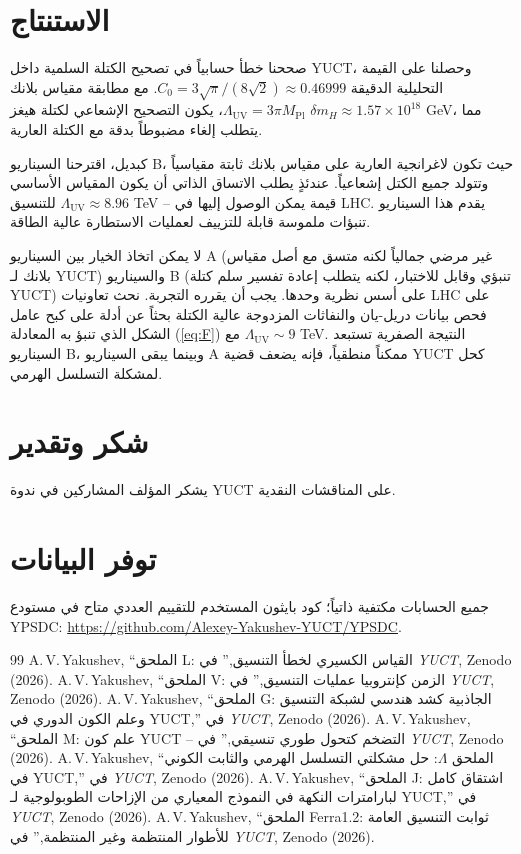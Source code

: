 \documentclass[11pt,a4paper]{article}
\newcommand{\Mpl}{M_{\mathrm{Pl}}}
\newcommand{\LUV}{\Lambda_{\mathrm{UV}}}
\theoremstyle{remark}
\begin{document}
\begin{otherlanguage}{arabic}
		\section{الاستنتاج}
		\label{sec:conclusion}
		
		صححنا خطأ حسابياً في تصحيح الكتلة السلمية داخل YUCT، وحصلنا على القيمة التحليلية الدقيقة \(C_0 = 3\sqrt{\pi}/(8\sqrt{2}) \approx 0.46999\). مع مطابقة مقياس بلانك \(\LUV = 3\pi\Mpl\)، يكون التصحيح الإشعاعي لكتلة هيغز \(\delta m_H \approx 1.57\times 10^{18}\) GeV، مما يتطلب إلغاء مضبوطاً بدقة مع الكتلة العارية.
		
		كبديل، اقترحنا السيناريو B، حيث تكون لاغرانجية العارية على مقياس بلانك ثابتة مقياسياً وتتولد جميع الكتل إشعاعياً. عندئذٍ يطلب الاتساق الذاتي أن يكون المقياس الأساسي للتنسيق \(\LUV \approx 8.96\) TeV – قيمة يمكن الوصول إليها في LHC. يقدم هذا السيناريو تنبؤات ملموسة قابلة للتزييف لعمليات الاستطارة عالية الطاقة.
		
		لا يمكن اتخاذ الخيار بين السيناريو A (غير مرضي جمالياً لكنه متسق مع أصل مقياس بلانك لـ YUCT) والسيناريو B (تنبؤي وقابل للاختبار، لكنه يتطلب إعادة تفسير سلم كتلة YUCT) على أسس نظرية وحدها. يجب أن يقرره التجربة. نحث تعاونيات LHC على فحص بيانات دريل-يان والنفاثات المزدوجة عالية الكتلة بحثاً عن أدلة على كبح عامل الشكل الذي تنبؤ به المعادلة (\ref{eq:F}) مع \(\LUV \sim 9\) TeV. النتيجة الصفرية تستبعد السيناريو B، وبينما يبقى السيناريو A ممكناً منطقياً، فإنه يضعف قضية YUCT كحل لمشكلة التسلسل الهرمي.
		
		\section*{شكر وتقدير}
		يشكر المؤلف المشاركين في ندوة YUCT على المناقشات النقدية.
		
		\section*{توفر البيانات}
		جميع الحسابات مكتفية ذاتياً؛ كود بايثون المستخدم للتقييم العددي متاح في مستودع YPSDC: \url{https://github.com/Alexey-Yakushev-YUCT/YPSDC}.
		
		\begin{thebibliography}{99}
			 A.\,V.\,Yakushev, “الملحق L: القياس الكسيري لخطأ التنسيق,” في \emph{YUCT}, Zenodo (2026).
			 A.\,V.\,Yakushev, “الملحق V: الزمن كإنتروبيا عمليات التنسيق,” في \emph{YUCT}, Zenodo (2026).
			 A.\,V.\,Yakushev, “الملحق G: الجاذبية كشد هندسي لشبكة التنسيق وعلم الكون الدوري في YUCT,” في \emph{YUCT}, Zenodo (2026).
			 A.\,V.\,Yakushev, “الملحق M: علم كون YUCT – التضخم كتحول طوري تنسيقي,” في \emph{YUCT}, Zenodo (2026).
			 A.\,V.\,Yakushev, “الملحق \(\Lambda\): حل مشكلتي التسلسل الهرمي والثابت الكوني في YUCT,” في \emph{YUCT}, Zenodo (2026).
			 A.\,V.\,Yakushev, “الملحق J: اشتقاق كامل لبارامترات النكهة في النموذج المعياري من الإزاحات الطوبولوجية لـ YUCT,” في \emph{YUCT}, Zenodo (2026).
			 A.\,V.\,Yakushev, “الملحق Ferra1.2: ثوابت التنسيق العامة للأطوار المنتظمة وغير المنتظمة,” في \emph{YUCT}, Zenodo (2026).
		\end{thebibliography}
		
	\end{otherlanguage}
	
\end{document}
